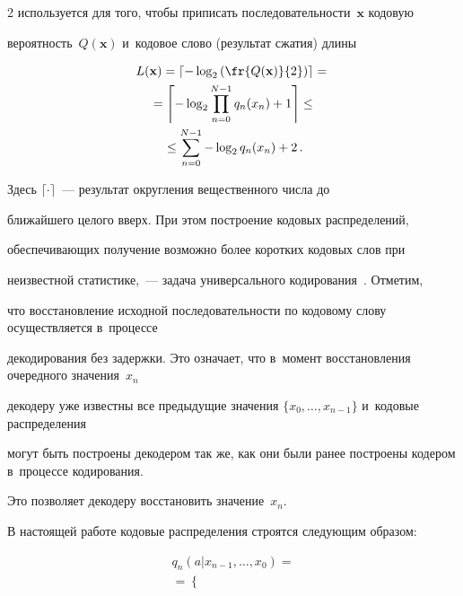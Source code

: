\begin{multicols}{2}
используется для того, чтобы приписать последовательности~$\mathbf{x}$  кодовую 

вероятность~$Q(\mathbf{x})$ и~кодовое слово (результат сжатия) длины

\begin{multline}

\label{eq01}

L(\mathbf{x}) = \left\lceil -\log_2 \left(\fr{Q(\mathbf{x})}{2}\right)  \right\rceil ={}\\

{}=

\left\lceil -\log_2 \prod\limits_{n=0}^{N-1}q_n(x_n)  + 1 \right\rceil \leq{}\\

{}\leq

\sum\limits_{n=0}^{N-1} -\log_2 q_n(x_n) + 2\,.

\end{multline}

Здесь $\lceil\cdot\rceil$~--- результат округления вещественного чис\-ла до 

ближайшего целого вверх. При этом построение кодовых распределений, 

обес\-пе\-чи\-ва\-ющих получение возможно более коротких кодовых слов при 

неизвестной статистике,~--- задача универсального кодирования~\cite{b4}. Отметим, 

что вос\-ста\-нов\-ле\-ние исходной последовательности по кодовому слову осуществляется в~процессе 

декодирования без задержки. Это означает, что в~момент восстановления очередного значения~$x_n$ 

декодеру уже известны все предыдущие значения $\{x_0,\dots,x_{n-1}\}$ и~кодовые распределения 

могут быть построены декодером так же, как они были ранее построены кодером в~процессе кодирования. 

Это позволяет декодеру восстановить значение~$x_n$. 



В настоящей работе кодовые распределения строятся следующим образом:

\begin{multline}

\label{eq02}

q_n(a\vert x_{n-1},\dots,x_0) ={}\\

{}= \begin{cases}


\end{cases}
\end{multline}
\end{multicols}
